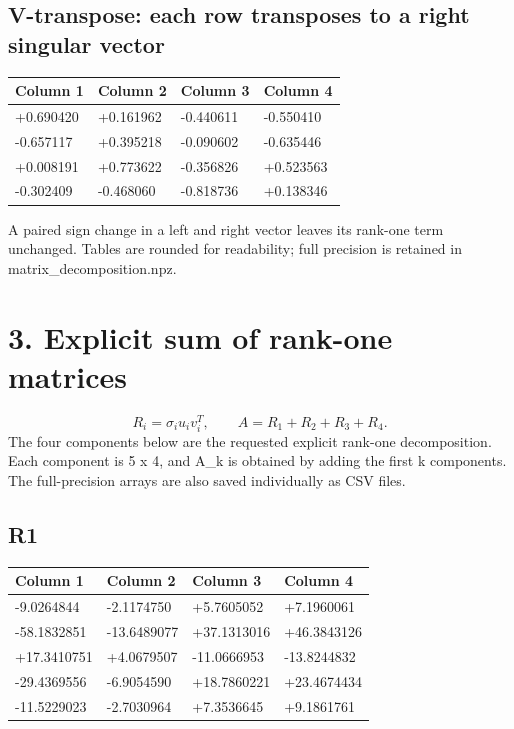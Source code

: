 \documentclass[a4paper,11pt]{article}
\begin{document}
\subsection*{V-transpose: each row transposes to a right singular vector}
\begin{center}\fontsize{8.5}{10.5}\selectfont\begin{tabular}{@{}llll@{}}\toprule
Column 1 & Column 2 & Column 3 & Column 4\\\midrule
+0.690420 & +0.161962 & -0.440611 & -0.550410\\
-0.657117 & +0.395218 & -0.090602 & -0.635446\\
+0.008191 & +0.773622 & -0.356826 & +0.523563\\
-0.302409 & -0.468060 & -0.818736 & +0.138346\\
\bottomrule\end{tabular}\end{center}
A paired sign change in a left and right vector leaves its rank-one term unchanged. Tables are rounded for readability; full precision is retained in matrix\_decomposition.npz.

\clearpage
\section*{3. Explicit sum of rank-one matrices}
\[R_i=\sigma_i u_i v_i^T,\qquad A=R_1+R_2+R_3+R_4.\]
The four components below are the requested explicit rank-one decomposition. Each component is 5 x 4, and A\_k is obtained by adding the first k components. The full-precision arrays are also saved individually as CSV files.

\subsection*{R1}
\begin{center}\fontsize{8.5}{10.5}\selectfont\begin{tabular}{@{}llll@{}}\toprule
Column 1 & Column 2 & Column 3 & Column 4\\\midrule
-9.0264844 & -2.1174750 & +5.7605052 & +7.1960061\\
-58.1832851 & -13.6489077 & +37.1313016 & +46.3843126\\
+17.3410751 & +4.0679507 & -11.0666953 & -13.8244832\\
-29.4369556 & -6.9054590 & +18.7860221 & +23.4674434\\
-11.5229023 & -2.7030964 & +7.3536645 & +9.1861761\\
\bottomrule\end{tabular}\end{center}
\end{document}
